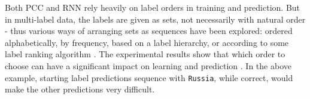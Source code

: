 



 




Both PCC and RNN rely heavily on label orders in training and prediction. But in multi-label data, the labels are given as sets, not necessarily with natural order - thus various ways of arranging sets as sequences have been explored:  ordered alphabetically,  by frequency, based on a label hierarchy, or according to some label ranking algorithm \cite{liu2015optimality}. The experimental results show that which order to choose can have a significant impact on learning and prediction \cite{vinyals2015order,DBLP:conf/nips/NamMKF17,DBLP:conf/aaai/ChenCYW18}. In the above example, starting label predictions sequence with \texttt{Russia}, while correct, would make the other predictions very difficult.

